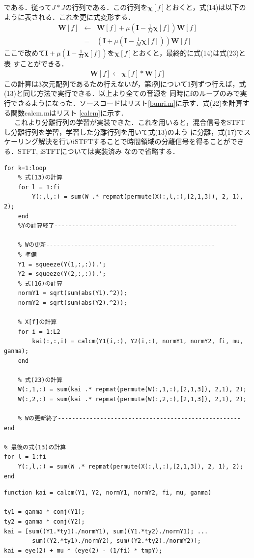 \documentclass[a4j]{jarticle}
\begin{document}
である．従って$J*J$の行列である．この行列を$\bm{\chi}[f]$とおくと，式(14)は以下のように表される．これを更に式変形する．
\begin{eqnarray}
 \bm{W}[f] &\leftarrow & \bm{W}[f] + \mu \left(\bm{I} - \frac{1}{M} \bm{\chi}[f] \right)\bm{W}[f] \nonumber \\
 &=& \left(\bm{I} + \mu \left(\bm{I} - \frac{1}{M} \bm{\chi}[f] \right) \right) \bm{W}[f] \nonumber
\end{eqnarray}
ここで改めて$\bm{I} + \mu \left(\bm{I} - \frac{1}{M} \bm{\chi}[f] \right)$を$\bm{\chi}[f]$とおくと，最終的に式(14)は式(23)と表
すことができる．
\begin{eqnarray}
 \bm{W}[f] \leftarrow \bm{\chi}[f] * \bm{W}[f]
\end{eqnarray}
この計算は3次元配列であるため行えないが，第i列について1列ずつ行えば，式(13)と同じ方法で実行できる．以上より全ての音源を
同時にfのループのみで実行できるようになった．ソースコードはリスト\ref{bunri.m}に示す．式(22)を計算する関数calcm.mはリスト
\ref{calcm}に示す．\\\ \ \ 
これより分離行列の学習が実装できた．これを用いると，混合信号をSTFTし分離行列を学習，学習した分離行列を用いて式(13)のよう
に分離，式(17)でスケーリング解決を行いiSTFTすることで時間領域の分離信号を得ることができる．STFT, iSTFTについては実装済み
なので省略する．

\begin{lstlisting}[caption=bunri.m, xleftmargin=1cm, label=bunri.m]
% 反復計算
for k=1:loop
    % 式(13)の計算
    for l = 1:fi
        Y(:,l,:) = sum(W .* repmat(permute(X(:,l,:),[2,1,3]), 2, 1), 2);
    end
    %Yの計算終了----------------------------------------------------
    
    % Wの更新------------------------------------------------
    % 準備
    Y1 = squeeze(Y(1,:,:)).';
    Y2 = squeeze(Y(2,:,:)).';
    % 式(16)の計算
    normY1 = sqrt(sum(abs(Y1).^2));
    normY2 = sqrt(sum(abs(Y2).^2));
    
    % X[f]の計算
    for i = 1:L2
        kai(:,:,i) = calcm(Y1(i,:), Y2(i,:), normY1, normY2, fi, mu, ganma);
    end

    % 式(23)の計算
    W(:,1,:) = sum(kai .* repmat(permute(W(:,1,:),[2,1,3]), 2,1), 2); 
    W(:,2,:) = sum(kai .* repmat(permute(W(:,2,:),[2,1,3]), 2,1), 2); 

    % Wの更新終了----------------------------------------------------
end

% 最後の式(13)の計算
for l = 1:fi
    Y(:,l,:) = sum(W .* repmat(permute(X(:,l,:),[2,1,3]), 2, 1), 2);
end
\end{lstlisting}
\begin{lstlisting}[caption=calcm.m, xleftmargin=1cm, label=calcm]
function kai = calcm(Y1, Y2, normY1, normY2, fi, mu, ganma)

ty1 = ganma * conj(Y1);
ty2 = ganma * conj(Y2);
kai = [sum((Y1.*ty1)./normY1), sum((Y1.*ty2)./normY1); ...
        sum((Y2.*ty1)./normY2), sum((Y2.*ty2)./normY2)];
kai = eye(2) + mu * (eye(2) - (1/fi) * tmpY);
\end{lstlisting}
\end{document}
